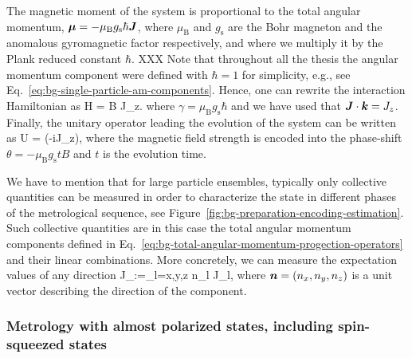 The magnetic moment of the system is proportional to the total angular momentum, $\boldsymbol{\mu}=-\mu_\text{B} g_{\text{s}}\hbar \boldsymbol{J}$, where $\mu_{\text{B}}$ and $g_{\text{s}}$ are the Bohr magneton and the anomalous gyromagnetic factor respectively, and where we multiply it by the Plank reduced constant $\hbar$.
XXX Note that throughout all the thesis the angular momentum component were defined with $\hbar{=}1$ for simplicity, e.g., see Eq.~\eqref{eq:bg-single-particle-am-components}.
Hence, one can rewrite the interaction Hamiltonian as
\be
  \label{eq:bg-hamiltonian-homogeneous-field}
  H = \gamma B J_z.
\ee
where $\gamma = \mu_\text{B} g_{\text{s}}\hbar$ and we have used that $\boldsymbol{J}\cdot\boldsymbol{k}=J_z$.
Finally, the unitary operator leading the evolution of the system can be written as
\be
  \label{eq:bg-unitary-homogeneous-field}
  U = \exp(-i\theta J_z),
\ee
where the magnetic field strength is encoded into the phase-shift $\theta=-\mu_\text{B} g_\text{s} t B$ and $t$ is the evolution time.

We have to mention that for large particle ensembles, typically only collective quantities can be measured in order to characterize the state in different phases of the metrological sequence, see Figure~\ref{fig:bg-preparation-encoding-estimation}.
Such collective quantities are in this case the total angular momentum components defined in Eq.~\eqref{eq:bg-total-angular-momentum-progection-operators} and their linear combinations.
More concretely, we can measure the expectation values of any direction
\be
  \label{eq:bg-total-angular-momentum-projector-arbitrary-direction}
  J_{}:=\sum_{l=x,y,z} n_l J_l,
\ee
where $\boldsymbol{n}=(n_x,n_y,n_z)$ is a unit vector describing the direction of the component.

\subsubsection[Metrology with almost polarized states]{Metrology with almost polarized states, including spin-squeezed states}
\label{sec:bg-metrology-with-almost-polarized}

